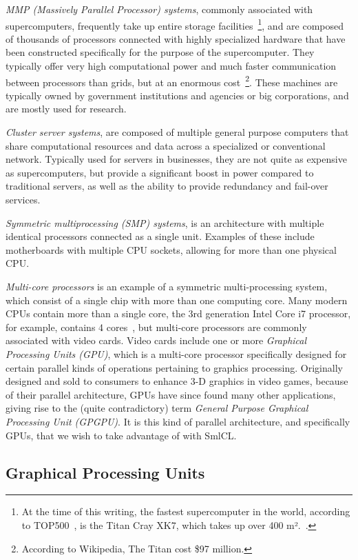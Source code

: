 \emph{MMP (Massively Parallel Processor) systems}, commonly associated
with supercomputers, frequently take up entire storage
facilities~\footnote{At the time of this writing, the fastest
  supercomputer in the world, according to TOP500~\cite{top500}, is
  the Titan Cray XK7, which takes up over 400
  m².~\cite{supercomputer-size}.}, and are composed of thousands of
processors connected with highly specialized hardware that have been
constructed specifically for the purpose of the supercomputer. They
typically offer very high computational power and much faster
communication between processors than grids, but at an enormous
cost~\footnote{According to Wikipedia, The Titan cost \$97
  million.}. These machines are typically owned by government
institutions and agencies or big corporations, and are mostly used for
research.

\emph{Cluster server systems}, are composed of multiple general
purpose computers that share computational resources and data across a
specialized or conventional network. Typically used for servers in
businesses, they are not quite as expensive as supercomputers, but
provide a significant boost in power compared to traditional servers,
as well as the ability to provide redundancy and fail-over services.

\emph{Symmetric multiprocessing (SMP) systems}, is an architecture
with multiple identical processors connected as a single
unit. Examples of these include motherboards with multiple CPU
sockets, allowing for more than one physical CPU.

\emph{Multi-core processors} is an example of a symmetric
multi-processing system, which consist of a single chip with more than
one computing core. Many modern CPUs contain more than a single core,
the 3rd generation Intel Core i7 processor, for example, contains 4
cores~\cite{intelcorei7}, but multi-core processors are commonly
associated with video cards. Video cards include one or more
\emph{Graphical Processing Units (GPU)}, which is a multi-core
processor specifically designed for certain parallel kinds of
operations pertaining to graphics processing. Originally designed and
sold to consumers to enhance 3-D graphics in video games, because of
their parallel architecture, GPUs have since found many other
applications, giving rise to the (quite contradictory) term
\emph{General Purpose Graphical Processing Unit (GPGPU)}. It is this
kind of parallel architecture, and specifically GPUs, that we wish to
take advantage of with SmlCL.

\subsection{Graphical Processing Units}

